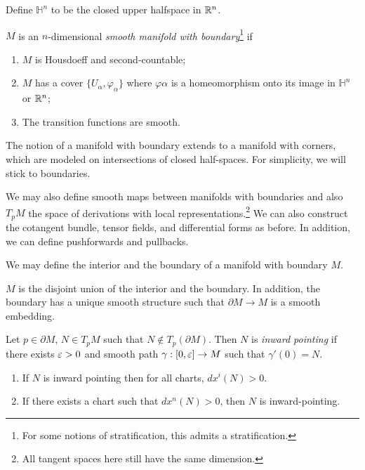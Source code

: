 \documentclass[twoside, 10pt]{article}
\begin{document}
    Define $\mathbb{H}^n$ to be the closed upper halfspace in $\mathbb{R}^n$.

    \begin{defn} $M$ is an $n$-dimensional \textit{smooth manifold with
        boundary}\footnote{For some notions of stratification, this admits a
    stratification.} if \begin{enumerate} \item $M$ is Housdoeff and
        second-countable; \item $M$ has a cover $\{U_{\alpha},
        \varphi_{\alpha}\}$ where $\varphi{\alpha}$ is a homeomorphism onto its
        image in $\mathbb{H}^n$ or $\mathbb{R}^n$; \item The transition functions are
smooth.  \end{enumerate} \end{defn}

    The notion of a manifold with boundary extends to a manifold with corners,
    which are modeled on intersections of closed half-spaces. For simplicity,
    we will stick to boundaries.

    We may also define smooth maps between manifolds with boundaries and also
    $T_pM$ the space of derivations with local representations.\footnote{All
    tangent spaces here still have the same dimension.} We can also construct
    the cotangent bundle, tensor fields, and differential forms as before. In
    addition, we can define pushforwards and pullbacks.

    \begin{defn} We may define the interior and the boundary of a manifold with
    boundary $M$.  \end{defn}

    \begin{prop} $M$ is the disjoint union of the interior and the boundary. In
    addition, the boundary has a unique smooth structure such that $\partial M
\to M$ is a smooth embedding.  \end{prop}

    \begin{defn} Let $p \in \partial M$, $N \in T_pM$ such that $N \notin
    T_p(\partial M)$. Then $N$ is \textit{inward pointing} if there exists $\varepsilon
> 0$ and smooth path $\gamma: [0,\varepsilon] \to M$ such that $\gamma'(0) = N$.
\end{defn}

    \begin{lem} \begin{enumerate} \item If $N$ is inward pointing then for all
    charts, $dx^i(N) > 0$.  \item If there exists a chart such that $dx^n(N) >
    0$, then $N$ is inward-pointing.  \end{enumerate} \end{lem}
\end{document}
